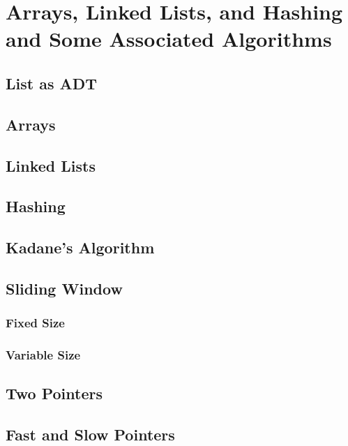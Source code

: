 \chapter{Arrays, Linked Lists, and Hashing and Some Associated Algorithms}
\section{List as ADT}
\section{Arrays}
\section{Linked Lists}
\section{Hashing}
\section{Kadane's Algorithm}
\section{Sliding Window}
\subsection{Fixed Size}
\subsection{Variable Size}
\section{Two Pointers}
\section{Fast and Slow Pointers}



